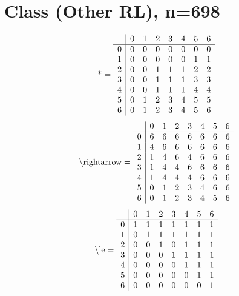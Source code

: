 \documentclass[11pt]{article}
\begin{document}
\section{Class (Other RL), n=698}
\[\text{*} = 
\begin{array}{r | r r r r r r r}
 & 0 & 1 & 2 & 3 & 4 & 5 & 6 \\ \hline
0 & 0 & 0 & 0 & 0 & 0 & 0 & 0 \\
1 & 0 & 0 & 0 & 0 & 0 & 1 & 1 \\
2 & 0 & 0 & 1 & 1 & 1 & 2 & 2 \\
3 & 0 & 0 & 1 & 1 & 1 & 3 & 3 \\
4 & 0 & 0 & 1 & 1 & 1 & 4 & 4 \\
5 & 0 & 1 & 2 & 3 & 4 & 5 & 5 \\
6 & 0 & 1 & 2 & 3 & 4 & 5 & 6 \\
\end{array}
\]
\[\text{\textbackslash rightarrow} = 
\begin{array}{r | r r r r r r r}
 & 0 & 1 & 2 & 3 & 4 & 5 & 6 \\ \hline
0 & 6 & 6 & 6 & 6 & 6 & 6 & 6 \\
1 & 4 & 6 & 6 & 6 & 6 & 6 & 6 \\
2 & 1 & 4 & 6 & 4 & 6 & 6 & 6 \\
3 & 1 & 4 & 4 & 6 & 6 & 6 & 6 \\
4 & 1 & 4 & 4 & 4 & 6 & 6 & 6 \\
5 & 0 & 1 & 2 & 3 & 4 & 6 & 6 \\
6 & 0 & 1 & 2 & 3 & 4 & 5 & 6 \\
\end{array}
\]
\[\text{\textbackslash le} = 
\begin{array}{r | r r r r r r r}
 & 0 & 1 & 2 & 3 & 4 & 5 & 6 \\ \hline
0 & 1 & 1 & 1 & 1 & 1 & 1 & 1 \\
1 & 0 & 1 & 1 & 1 & 1 & 1 & 1 \\
2 & 0 & 0 & 1 & 0 & 1 & 1 & 1 \\
3 & 0 & 0 & 0 & 1 & 1 & 1 & 1 \\
4 & 0 & 0 & 0 & 0 & 1 & 1 & 1 \\
5 & 0 & 0 & 0 & 0 & 0 & 1 & 1 \\
6 & 0 & 0 & 0 & 0 & 0 & 0 & 1 \\
\end{array}
\]
\end{document}
